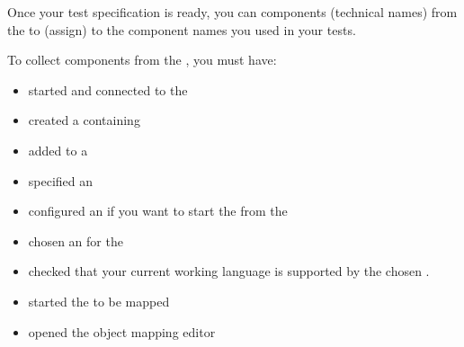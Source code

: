
Once your test specification is ready, you can   components (technical names) from the \gdaut{} to  (assign) to the component names you used in your tests. 

To collect components from the \gdaut{}, you must have: 

\begin{itemize}
\item started and connected to the \gdagent{} 
\item created a \gdcase{} containing \gdsteps{} 
\item added \gdcases to a \gdsuite{} 
\item specified an \gdaut{}  
\item configured an \gdaut{}  if you want to start the \gdaut{} from the \ite{}
\item chosen an \gdaut{} for the \gdsuite{} 
\item checked that your current working language is supported by the chosen \gdaut{}. 
\item started the \gdaut{} to be mapped 
\item opened the object mapping editor 
\end{itemize}


